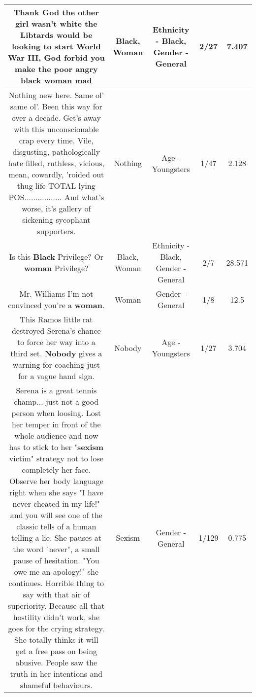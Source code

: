 \documentclass[11pt]{article}
\newlength\mylength
\begin{document}
\begin{center}
\begin{longtable}{|C{.65\mylength}|C{.30\mylength}|C{.12\mylength}|C{.12\mylength}|C{.12\mylength}|}
  \small Thank God the other girl wasn't white the Libtards would be looking to start World War III, God forbid  you make the poor angry \textbf{black} \textbf{woman} mad\normalsize   & Black, Woman & Ethnicity - Black, Gender - General & 2/27 & 7.407 \\  \hline
  \small Nothing new here. Same ol' same ol'. Been this way for over a decade. Get's away with this unconscionable crap every time. Vile, disgusting, pathologically hate filled, ruthless, vicious, mean, cowardly, 'roided out thug life TOTAL lying POS................. And what's worse, it's gallery of sickening sycophant supporters.\normalsize   & Nothing & Age - Youngsters & 1/47 & 2.128 \\  \hline
  \small Is this \textbf{Black} Privilege? Or \textbf{woman} Privilege?\normalsize   & Black, Woman & Ethnicity - Black, Gender - General & 2/7 & 28.571 \\  \hline
  \small Mr. Williams I'm not convinced you're a \textbf{woman}.\normalsize   & Woman & Gender - General & 1/8 & 12.5 \\  \hline
  \small This Ramos little rat destroyed Serena's chance to force her way into a third set. \textbf{Nobody} gives a warning for coaching just for a vague hand sign.\normalsize   & Nobody & Age - Youngsters & 1/27 & 3.704 \\  \hline
  \small Serena is a great tennis champ... just not a good person when loosing. Lost her temper in front of the whole audience and now has to stick to her "\textbf{sexism} victim" strategy not to lose completely her face. Observe her body language right when she says "I have never cheated in my life!" and you will see one of the classic tells of a human telling a lie. She pauses at the word "never", a small pause of hesitation. "You owe me an apology!" she continues. Horrible thing to say with that air of superiority. Because all that hostility didn't work, she goes for the crying strategy. She totally thinks it will get a free pass on being abusive. People saw the truth in her intentions and shameful behaviours.\normalsize   & Sexism & Gender - General & 1/129 & 0.775 \\  \hline

\end{longtable}
\end{center}
\end{document}
